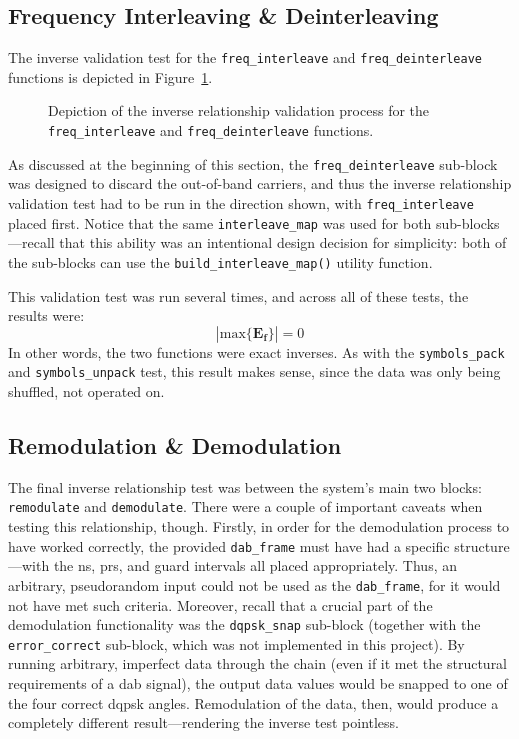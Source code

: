 \documentclass[class=report,11pt,crop=false]{standalone}
\begin{document}
\subsection{Frequency Interleaving \& Deinterleaving}
The inverse validation test for the \texttt{freq\_interleave} and \texttt{freq\_deinterleave} functions is depicted in Figure~\ref{fig:inverse-freq-interleave-deinterleave}.
\begin{figure}[htbp]
  \centering
  \captionsetup{type=figure}
  \def\svgwidth{\linewidth}
  { %
      }
  \caption{Depiction of the inverse relationship validation process for the \texttt{freq\_interleave} and \texttt{freq\_deinterleave} functions.}
  \label{fig:inverse-freq-interleave-deinterleave}
\end{figure}

As discussed at the beginning of this section, the \texttt{freq\_deinterleave} sub-block was designed to discard the out-of-band carriers, and thus the inverse relationship validation test had to be run in the direction shown, with \texttt{freq\_interleave} placed first. Notice that the same \texttt{interleave\_map} was used for both sub-blocks---recall that this ability was an intentional design decision for simplicity: both of the sub-blocks can use the \texttt{build\_interleave\_map()} utility function.

This validation test was run several times, and across all of these tests, the results were:
\begin{equation}
  \left| \mathrm{max} \{ \mathbf{E_f} \} \right| = 0
\end{equation}
In other words, the two functions were exact inverses. As with the \texttt{symbols\_pack} and \texttt{symbols\_unpack} test, this result makes sense, since the data was only being shuffled, not operated on. 

\subsection{Remodulation \& Demodulation}
The final inverse relationship test was between the system's main two blocks: \texttt{remodulate} and \texttt{demodulate}. There were a couple of important caveats when testing this relationship, though. Firstly, in order for the demodulation process to have worked correctly, the provided \texttt{dab\_frame} must have had a specific structure---with the \gls{ns}, \gls{prs}, and guard intervals all placed appropriately. Thus, an arbitrary, pseudorandom input could not be used as the \texttt{dab\_frame}, for it would not have met such criteria. Moreover, recall that a crucial part of the demodulation functionality was the \texttt{dqpsk\_snap} sub-block (together with the \texttt{error\_correct} sub-block, which was not implemented in this project). By running arbitrary, imperfect data through the chain (even if it met the structural requirements of a \gls{dab} signal), the output data values would be snapped to one of the four correct \gls{dqpsk} angles. Remodulation of the data, then, would produce a completely different result---rendering the inverse test pointless.
\end{document}
